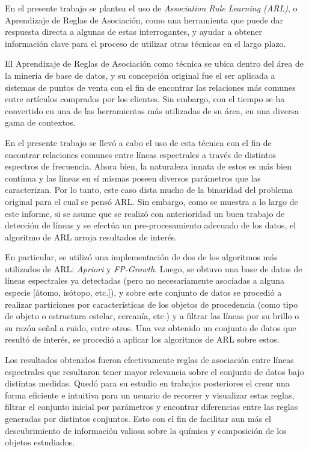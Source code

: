 \begin{intro}
En el presente trabajo se plantea el uso de \textit{Association Rule Learning (ARL)}, o Aprendizaje de Reglas de Asociación, como una herramienta que puede dar respuesta directa a algunas de estas interrogantes, y ayudar a obtener información clave para el proceso de utilizar otras técnicas en el largo plazo.

El Aprendizaje de Reglas de Asociación como técnica se ubica dentro del área de la minería de base de datos, y su concepción original fue el ser aplicada a sistemas de puntos de venta con el fin de encontrar las relaciones más comunes entre artículos comprados por los clientes. Sin embargo, con el tiempo se ha convertido en una de las herramientas más utilizadas de su área, en una diversa gama de contextos.

En el presente trabajo se llevó a cabo el uso de esta técnica con el fin de encontrar relaciones comunes entre líneas espectrales a través de distintos espectros de frecuencia. Ahora bien, la naturaleza innata de estos es más bien contínua y las líneas en sí mismas poseen diversos parámetros que las caracterizan. Por lo tanto, este caso dista mucho de la binaridad del problema original para el cual se pensó ARL. Sin embargo, como se muestra a lo largo de este informe, si se asume que se realizó con anterioridad un buen trabajo de detección de líneas y se efectúa un pre-procesamiento adecuado de los datos, el algoritmo de ARL arroja resultados de interés.

En particular, se utilizó una implementación de dos de los algoritmos más utilizados de ARL: \textit{Apriori} y \textit{FP-Growth}. Luego, se obtuvo una base de datos de líneas espectrales ya detectadas (pero no necesariamente asociadas a alguna especie [átomo, isótopo, etc.]), y sobre este conjunto de datos se procedió a realizar particiones por características de los objetos de procedencia (como tipo de objeto o estructura estelar, cercanía, etc.) y a filtrar las líneas por su brillo o su razón señal a ruido, entre otros. Una vez obtenido un conjunto de datos que resultó de interés, se procedió a aplicar los algoritmos de ARL sobre estos.

Los resultados obtenidos fueron efectivamente reglas de asociación entre líneas espectrales que resultaron tener mayor relevancia sobre el conjunto de datos bajo distintas medidas. Quedó para su estudio en trabajos posteriores el crear una forma eficiente e intuitiva para un usuario de recorrer y visualizar estas reglas, filtrar el conjunto inicial por parámetros y encontrar diferencias entre las reglas generadas por distintos conjuntos. Esto con el fin de facilitar aun más el descubrimiento de información valiosa sobre la química y composición de los objetos estudiados.

\end{intro}